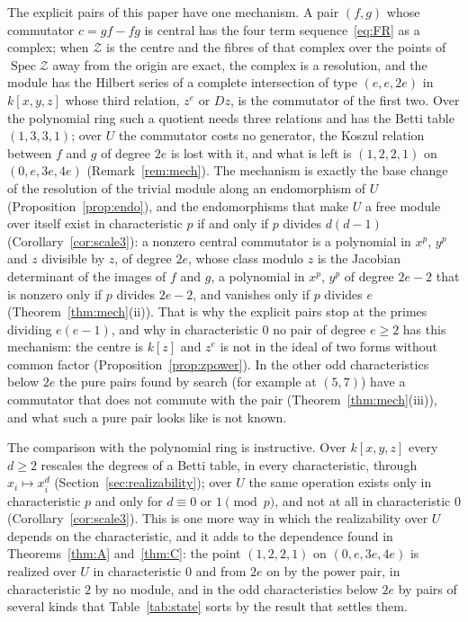 \documentclass[11pt]{article}
\theoremstyle{definition}
\theoremstyle{remark}
\begin{document}
The explicit pairs of this paper have one mechanism. A pair $(f,g)$ whose commutator $c=gf-fg$ is central has the four term sequence~\eqref{eq:FR} as a complex; when $\mathcal Z$ is the centre and the fibres of that complex over the points of $\operatorname{Spec}\mathcal Z$ away from the origin are exact, the complex is a resolution, and the module has the Hilbert series of a complete intersection of type $(e,e,2e)$ in $k[x,y,z]$ whose third relation, $z^e$ or $Dz$, is the commutator of the first two. Over the polynomial ring such a quotient needs three relations and has the Betti table $(1,3,3,1)$; over $U$ the commutator costs no generator, the Koszul relation between $f$ and $g$ of degree $2e$ is lost with it, and what is left is $(1,2,2,1)$ on $(0,e,3e,4e)$ (Remark~\ref{rem:mech}). The mechanism is exactly the base change of the resolution of the trivial module along an endomorphism of $U$ (Proposition~\ref{prop:endo}), and the endomorphisms that make $U$ a free module over itself exist in characteristic $p$ if and only if $p$ divides $d(d-1)$ (Corollary~\ref{cor:scale3}): a nonzero central commutator is a polynomial in $x^p$, $y^p$ and $z$ divisible by $z$, of degree $2e$, whose class modulo $z$ is the Jacobian determinant of the images of $f$ and $g$, a polynomial in $x^p$, $y^p$ of degree $2e-2$ that is nonzero only if $p$ divides $2e-2$, and vanishes only if $p$ divides $e$ (Theorem~\ref{thm:mech}(ii)). That is why the explicit pairs stop at the primes dividing $e(e-1)$, and why in characteristic $0$ no pair of degree $e\ge2$ has this mechanism: the centre is $k[z]$ and $z^e$ is not in the ideal of two forms without common factor (Proposition~\ref{prop:zpower}). In the other odd characteristics below $2e$ the pure pairs found by search (for example at $(5,7)$) have a commutator that does not commute with the pair (Theorem~\ref{thm:mech}(iii)), and what such a pure pair looks like is not known.

The comparison with the polynomial ring is instructive. Over $k[x,y,z]$ every $d\ge2$ rescales the degrees of a Betti table, in every characteristic, through $x_i\mapsto x_i^d$ (Section~\ref{sec:realizability}); over $U$ the same operation exists only in characteristic $p$ and only for $d\equiv0$ or $1\pmod p$, and not at all in characteristic $0$ (Corollary~\ref{cor:scale3}). This is one more way in which the realizability over $U$ depends on the characteristic, and it adds to the dependence found in Theorems~\ref{thm:A} and~\ref{thm:C}: the point $(1,2,2,1)$ on $(0,e,3e,4e)$ is realized over $U$ in characteristic $0$ and from $2e$ on by the power pair, in characteristic $2$ by no module, and in the odd characteristics below $2e$ by pairs of several kinds that Table~\ref{tab:state} sorts by the result that settles them.
\end{document}
